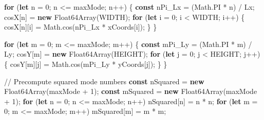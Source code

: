\documentclass[
  letterpaper,
  DIV=11,
  numbers=noendperiod]{scrreprt}
\newenvironment{Shaded}{\begin{snugshade}}{\end{snugshade}}
\newcommand{\BuiltInTok}[1]{\textcolor[rgb]{0.00,0.23,0.31}{#1}}
\newcommand{\CommentTok}[1]{\textcolor[rgb]{0.37,0.37,0.37}{#1}}
\newcommand{\ConstantTok}[1]{\textcolor[rgb]{0.56,0.35,0.01}{#1}}
\newcommand{\ControlFlowTok}[1]{\textcolor[rgb]{0.00,0.23,0.31}{\textbf{#1}}}
\newcommand{\DecValTok}[1]{\textcolor[rgb]{0.68,0.00,0.00}{#1}}
\newcommand{\FunctionTok}[1]{\textcolor[rgb]{0.28,0.35,0.67}{#1}}
\newcommand{\KeywordTok}[1]{\textcolor[rgb]{0.00,0.23,0.31}{\textbf{#1}}}
\newcommand{\NormalTok}[1]{\textcolor[rgb]{0.00,0.23,0.31}{#1}}
\newcommand{\OperatorTok}[1]{\textcolor[rgb]{0.37,0.37,0.37}{#1}}
\begin{document}
\begin{Shaded}
\begin{Highlighting}[]
    \ControlFlowTok{for}\NormalTok{ (}\KeywordTok{let}\NormalTok{ n }\OperatorTok{=} \DecValTok{0}\OperatorTok{;}\NormalTok{ n }\OperatorTok{\textless{}=}\NormalTok{ maxMode}\OperatorTok{;}\NormalTok{ n}\OperatorTok{++}\NormalTok{) \{}
        \KeywordTok{const}\NormalTok{ nPi\_Lx }\OperatorTok{=}\NormalTok{ (}\BuiltInTok{Math}\OperatorTok{.}\ConstantTok{PI} \OperatorTok{*}\NormalTok{ n) }\OperatorTok{/}\NormalTok{ Lx}\OperatorTok{;}
\NormalTok{        cosX[n] }\OperatorTok{=} \KeywordTok{new} \BuiltInTok{Float64Array}\NormalTok{(WIDTH)}\OperatorTok{;}
        \ControlFlowTok{for}\NormalTok{ (}\KeywordTok{let}\NormalTok{ i }\OperatorTok{=} \DecValTok{0}\OperatorTok{;}\NormalTok{ i }\OperatorTok{\textless{}}\NormalTok{ WIDTH}\OperatorTok{;}\NormalTok{ i}\OperatorTok{++}\NormalTok{) \{}
\NormalTok{            cosX[n][i] }\OperatorTok{=} \BuiltInTok{Math}\OperatorTok{.}\FunctionTok{cos}\NormalTok{(nPi\_Lx }\OperatorTok{*}\NormalTok{ xCoords[i])}\OperatorTok{;}
\NormalTok{        \}}
\NormalTok{    \}}

    \ControlFlowTok{for}\NormalTok{ (}\KeywordTok{let}\NormalTok{ m }\OperatorTok{=} \DecValTok{0}\OperatorTok{;}\NormalTok{ m }\OperatorTok{\textless{}=}\NormalTok{ maxMode}\OperatorTok{;}\NormalTok{ m}\OperatorTok{++}\NormalTok{) \{}
        \KeywordTok{const}\NormalTok{ mPi\_Ly }\OperatorTok{=}\NormalTok{ (}\BuiltInTok{Math}\OperatorTok{.}\ConstantTok{PI} \OperatorTok{*}\NormalTok{ m) }\OperatorTok{/}\NormalTok{ Ly}\OperatorTok{;}
\NormalTok{        cosY[m] }\OperatorTok{=} \KeywordTok{new} \BuiltInTok{Float64Array}\NormalTok{(HEIGHT)}\OperatorTok{;}
        \ControlFlowTok{for}\NormalTok{ (}\KeywordTok{let}\NormalTok{ j }\OperatorTok{=} \DecValTok{0}\OperatorTok{;}\NormalTok{ j }\OperatorTok{\textless{}}\NormalTok{ HEIGHT}\OperatorTok{;}\NormalTok{ j}\OperatorTok{++}\NormalTok{) \{}
\NormalTok{            cosY[m][j] }\OperatorTok{=} \BuiltInTok{Math}\OperatorTok{.}\FunctionTok{cos}\NormalTok{(mPi\_Ly }\OperatorTok{*}\NormalTok{ yCoords[j])}\OperatorTok{;}
\NormalTok{        \}}
\NormalTok{    \}}

    \CommentTok{// Precompute squared mode numbers}
    \KeywordTok{const}\NormalTok{ nSquared }\OperatorTok{=} \KeywordTok{new} \BuiltInTok{Float64Array}\NormalTok{(maxMode }\OperatorTok{+} \DecValTok{1}\NormalTok{)}\OperatorTok{;}
    \KeywordTok{const}\NormalTok{ mSquared }\OperatorTok{=} \KeywordTok{new} \BuiltInTok{Float64Array}\NormalTok{(maxMode }\OperatorTok{+} \DecValTok{1}\NormalTok{)}\OperatorTok{;}
    \ControlFlowTok{for}\NormalTok{ (}\KeywordTok{let}\NormalTok{ n }\OperatorTok{=} \DecValTok{0}\OperatorTok{;}\NormalTok{ n }\OperatorTok{\textless{}=}\NormalTok{ maxMode}\OperatorTok{;}\NormalTok{ n}\OperatorTok{++}\NormalTok{) nSquared[n] }\OperatorTok{=}\NormalTok{ n }\OperatorTok{*}\NormalTok{ n}\OperatorTok{;}
    \ControlFlowTok{for}\NormalTok{ (}\KeywordTok{let}\NormalTok{ m }\OperatorTok{=} \DecValTok{0}\OperatorTok{;}\NormalTok{ m }\OperatorTok{\textless{}=}\NormalTok{ maxMode}\OperatorTok{;}\NormalTok{ m}\OperatorTok{++}\NormalTok{) mSquared[m] }\OperatorTok{=}\NormalTok{ m }\OperatorTok{*}\NormalTok{ m}\OperatorTok{;}


\end{Highlighting}
\end{Shaded}
\end{document}
